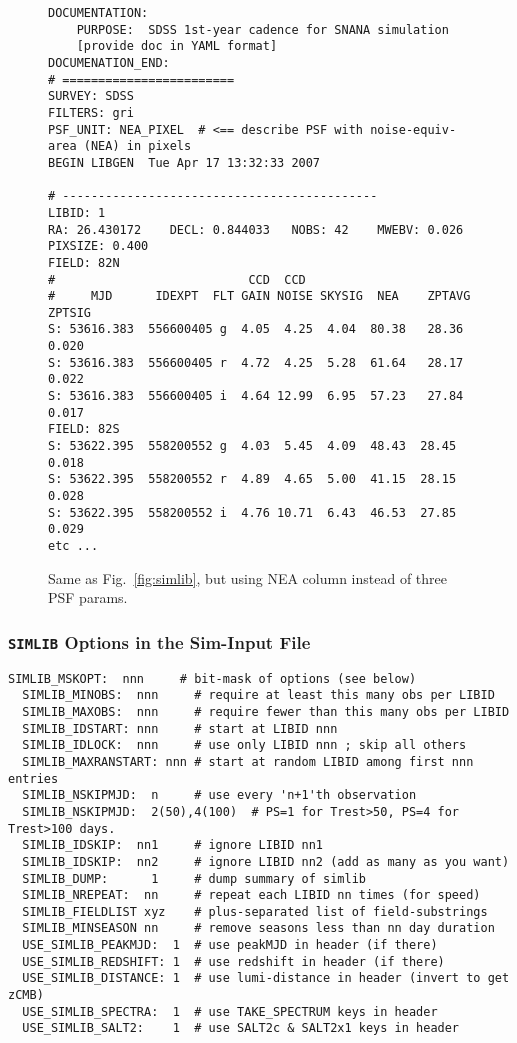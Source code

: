\documentclass[12pt]{article}
\newcommand{\simlib}{{\tt SIMLIB}}
\begin{document}
{\begin{figure} [ht] 
\begin{center}
\begin{Verbatim}[frame=single]
DOCUMENTATION:
    PURPOSE:  SDSS 1st-year cadence for SNANA simulation
    [provide doc in YAML format]
DOCUMENATION_END:
# ========================
SURVEY: SDSS     
FILTERS: gri 
PSF_UNIT: NEA_PIXEL  # <== describe PSF with noise-equiv-area (NEA) in pixels
BEGIN LIBGEN  Tue Apr 17 13:32:33 2007
 
# -------------------------------------------- 
LIBID: 1 
RA: 26.430172    DECL: 0.844033   NOBS: 42    MWEBV: 0.026   PIXSIZE: 0.400 
FIELD: 82N
#                           CCD  CCD        
#     MJD      IDEXPT  FLT GAIN NOISE SKYSIG  NEA    ZPTAVG ZPTSIG
S: 53616.383  556600405 g  4.05  4.25  4.04  80.38   28.36  0.020 
S: 53616.383  556600405 r  4.72  4.25  5.28  61.64   28.17  0.022 
S: 53616.383  556600405 i  4.64 12.99  6.95  57.23   27.84  0.017 
FIELD: 82S
S: 53622.395  558200552 g  4.03  5.45  4.09  48.43  28.45  0.018 
S: 53622.395  558200552 r  4.89  4.65  5.00  41.15  28.15  0.028 
S: 53622.395  558200552 i  4.76 10.71  6.43  46.53  27.85  0.029 
etc ...
\end{Verbatim}
\end{center}
\caption{
  Same as Fig.~\ref{fig:simlib}, but using NEA column instead of
  three PSF params.
 }
\label{fig:simlib_nea}
\end{figure}



\clearpage
\subsubsection{{\simlib} Options in the Sim-Input File}
\label{sssec:simlib_options}

\begin{Verbatim}[frame=single]
  SIMLIB_MSKOPT:  nnn     # bit-mask of options (see below)
  SIMLIB_MINOBS:  nnn     # require at least this many obs per LIBID
  SIMLIB_MAXOBS:  nnn     # require fewer than this many obs per LIBID
  SIMLIB_IDSTART: nnn     # start at LIBID nnn
  SIMLIB_IDLOCK:  nnn     # use only LIBID nnn ; skip all others
  SIMLIB_MAXRANSTART: nnn # start at random LIBID among first nnn entries
  SIMLIB_NSKIPMJD:  n     # use every 'n+1'th observation
  SIMLIB_NSKIPMJD:  2(50),4(100)  # PS=1 for Trest>50, PS=4 for Trest>100 days.
  SIMLIB_IDSKIP:  nn1     # ignore LIBID nn1
  SIMLIB_IDSKIP:  nn2     # ignore LIBID nn2 (add as many as you want)  
  SIMLIB_DUMP:      1     # dump summary of simlib 
  SIMLIB_NREPEAT:  nn     # repeat each LIBID nn times (for speed)
  SIMLIB_FIELDLIST xyz    # plus-separated list of field-substrings
  SIMLIB_MINSEASON nn     # remove seasons less than nn day duration
  USE_SIMLIB_PEAKMJD:  1  # use peakMJD in header (if there)
  USE_SIMLIB_REDSHIFT: 1  # use redshift in header (if there)
  USE_SIMLIB_DISTANCE: 1  # use lumi-distance in header (invert to get zCMB)
  USE_SIMLIB_SPECTRA:  1  # use TAKE_SPECTRUM keys in header 
  USE_SIMLIB_SALT2:    1  # use SALT2c & SALT2x1 keys in header


\end{Verbatim}}
\end{document}
